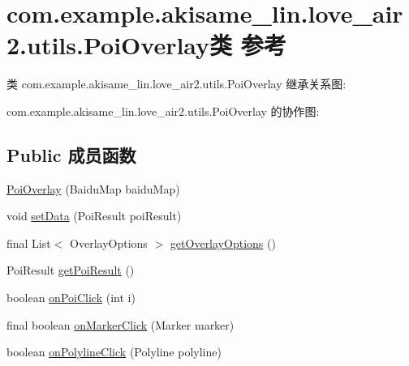 \hypertarget{classcom_1_1example_1_1akisame__lin_1_1love__air2_1_1utils_1_1_poi_overlay}{}\section{com.\+example.\+akisame\+\_\+lin.\+love\+\_\+air2.\+utils.\+Poi\+Overlay类 参考}
\label{classcom_1_1example_1_1akisame__lin_1_1love__air2_1_1utils_1_1_poi_overlay}


类 com.\+example.\+akisame\+\_\+lin.\+love\+\_\+air2.\+utils.\+Poi\+Overlay 继承关系图\+:


com.\+example.\+akisame\+\_\+lin.\+love\+\_\+air2.\+utils.\+Poi\+Overlay 的协作图\+:
\subsection*{Public 成员函数}
\begin{DoxyCompactItemize}
\item 
\mbox{\hyperlink{classcom_1_1example_1_1akisame__lin_1_1love__air2_1_1utils_1_1_poi_overlay_aac75a0e6f7786fe6de7eae966787d14e}{Poi\+Overlay}} (Baidu\+Map baidu\+Map)
\item 
void \mbox{\hyperlink{classcom_1_1example_1_1akisame__lin_1_1love__air2_1_1utils_1_1_poi_overlay_a6867ec21c705a2cb05cf99378402b58b}{set\+Data}} (Poi\+Result poi\+Result)
\item 
final List$<$ Overlay\+Options $>$ \mbox{\hyperlink{classcom_1_1example_1_1akisame__lin_1_1love__air2_1_1utils_1_1_poi_overlay_a11b328621378f3617b3bec637d284a2f}{get\+Overlay\+Options}} ()
\item 
Poi\+Result \mbox{\hyperlink{classcom_1_1example_1_1akisame__lin_1_1love__air2_1_1utils_1_1_poi_overlay_ac4ae0ea6ded3c43fd21afed706061bf8}{get\+Poi\+Result}} ()
\item 
boolean \mbox{\hyperlink{classcom_1_1example_1_1akisame__lin_1_1love__air2_1_1utils_1_1_poi_overlay_a2b20299ed0649e62a0b97c53ad3638d1}{on\+Poi\+Click}} (int i)
\item 
final boolean \mbox{\hyperlink{classcom_1_1example_1_1akisame__lin_1_1love__air2_1_1utils_1_1_poi_overlay_a9e797b399728e7320fe29c34bc19596f}{on\+Marker\+Click}} (Marker marker)
\item 
boolean \mbox{\hyperlink{classcom_1_1example_1_1akisame__lin_1_1love__air2_1_1utils_1_1_poi_overlay_aaab0bd244021417fc0dd341369212bca}{on\+Polyline\+Click}} (Polyline polyline)
\end{DoxyCompactItemize}
